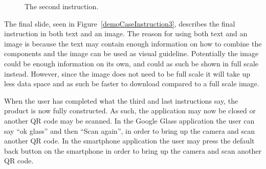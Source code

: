 	\begin{figure}[H]%
		\centering
		\qquad
		\qquad
		\caption{The second instruction.}
		\label{demoCaseInstruction2}
	\end{figure}

The final slide, seen in Figure~\ref{demoCaseInstruction3}, describes the final instruction in both text and an image. The reason for using both text and an image is because the text may contain enough information on how to combine the components and the image can be used as visual guideline. Potentially the image could be enough information on its own, and could as such be shown in full scale instead. However, since the image does not need to be full scale it will take up less data space and as such be faster to download compared to a full scale image.

When the user has completed what the third and last instructions say, the product is now fully constructed. As such, the application may now be closed or another QR code may be scanned. In the Google Glass application the user can say ``ok glass'' and then ``Scan again'', in order to bring up the camera and scan another QR code. In the smartphone application the user may press the default back button on the smartphone in order to bring up the camera and scan another QR code.

